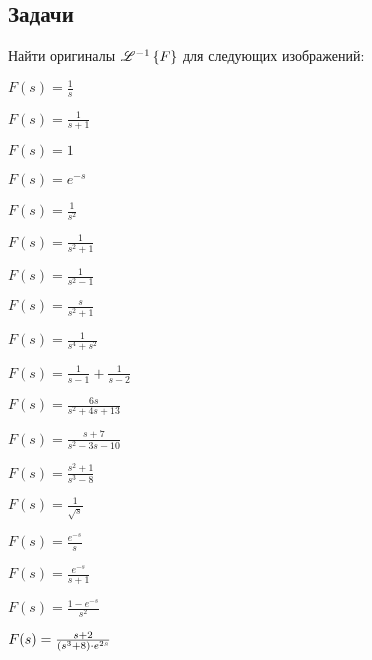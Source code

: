 \subsection{Задачи}

	Найти оригиналы $\mathscr{L}^{-1} \left\lbrace {F} \right\rbrace$ для следующих изображений:

	\begin{multicols}{3}
		\begin{enumtasks}

			\item \( F(s) = \frac{1}{s} \)
			\item \( F(s) = \frac{1}{s + 1} \)
			\item \( F(s) = 1 \)
			\item \( F(s) = e^{-s} \)
			\item \( F(s) = \frac{1}{s^2} \)
			\item \( F(s) = \frac{1}{s^2 + 1} \)
			\item \( F(s) = \frac{1}{s^2 - 1} \)
			\item \( F(s) = \frac{s}{s^2 + 1} \)
			\item \( F(s) = \frac{1}{s^4 + s^2} \)
			\item \( F(s) = \frac{1}{s-1} + \frac{1}{s-2} \)
			\item \( F(s) = \frac{6s}{s^2 + 4s + 13} \)
			\item \( F(s) = \frac{s+7}{s^2 - 3s - 10} \)
			\item \( F(s) = \frac{s^2 + 1}{s^3 - 8} \)
			\item \( F(s) = \frac{1}{\sqrt{s}} \)

		\end{enumtasks}
	\end{multicols}

	\vspace{10pt}

	\begin{multicols}{3}
		\begin{enumtasks}
			
			\item \( F(s) = \frac{e^{-s}}{s} \)
			\item \( F(s) = \frac{e^{-s}}{s+1} \)
			\item \( F(s) = \frac{1 - e^{-s}}{s^2} \)
			\item \( F(s) = \frac{s + 2}{\left( s^3 + 8 \right) \cdot e^{2s}} \)

		\end{enumtasks}
	\end{multicols}

